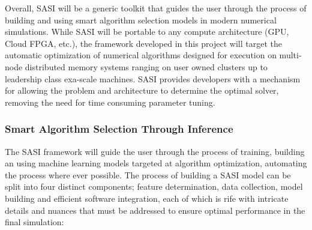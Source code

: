 Overall, SASI will be a generic toolkit that guides the user through the process of building and using smart algorithm selection models in modern numerical simulations. While SASI will be portable to any compute architecture (GPU, Cloud FPGA, etc.), the framework developed in this project will target the automatic optimization of numerical algorithms designed for execution on multi-node distributed memory systems ranging on user owned clusters up to leadership class exa-scale machines. SASI provides developers with a mechanism for allowing the problem and architecture to determine the optimal solver, removing the need for time consuming parameter tuning. 

\subsubsection{Smart Algorithm Selection Through Inference }

The SASI framework will guide the user through the process of training, building an using machine learning models targeted at algorithm optimization, automating the process where ever possible. The process of building a SASI model can be split into four distinct components; feature determination, data collection, model building and efficient software integration, each of which is rife with intricate details and nuances that must be addressed to ensure optimal performance in the final simulation:

